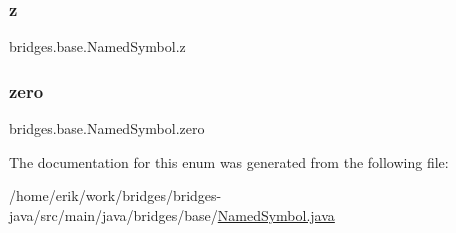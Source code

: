 \subsubsection{\texorpdfstring{z}{z}}
{\footnotesize\ttfamily bridges.\+base.\+Named\+Symbol.\+z}

\mbox{\label{enumbridges_1_1base_1_1_named_symbol_a3db51a591e688df96b707c28a7b03ae4}} 
\subsubsection{\texorpdfstring{zero}{zero}}
{\footnotesize\ttfamily bridges.\+base.\+Named\+Symbol.\+zero}



The documentation for this enum was generated from the following file\+:\begin{DoxyCompactItemize}
\item 
/home/erik/work/bridges/bridges-\/java/src/main/java/bridges/base/\hyperlink{_named_symbol_8java}{Named\+Symbol.\+java}\end{DoxyCompactItemize}
